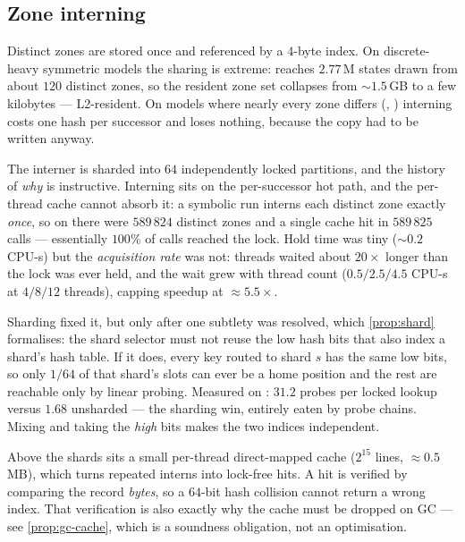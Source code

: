 \subsection{Zone interning}

\FigIntern

Distinct zones are stored once and referenced by a $4$-byte index.  On
discrete-heavy symmetric models the sharing is extreme:  reaches
$2.77$\,M states drawn from about $120$ distinct zones, so the resident zone set
collapses from $\sim1.5$\,GB to a few kilobytes --- L2-resident.  On models
where nearly every zone differs (, ) interning costs
one hash per successor and loses nothing, because the copy had to be written
anyway.

The interner is sharded into $64$ independently locked partitions, and the
history of \emph{why} is instructive.  Interning sits on the per-successor hot
path, and the per-thread cache cannot absorb it: a symbolic run interns each
distinct zone exactly \emph{once}, so on  there were $589\,824$
distinct zones and a single cache hit in $589\,825$ calls --- essentially $100\%$
of calls reached the lock.  Hold time was tiny ($\sim0.2$ CPU-s) but the
\emph{acquisition rate} was not: threads waited about $20\times$ longer than the
lock was ever held, and the wait grew with thread count ($0.5 / 2.5 / 4.5$
CPU-s at $4/8/12$ threads), capping speedup at $\approx 5.5\times$.

Sharding fixed it, but only after one subtlety was resolved, which
\cref{prop:shard} formalises: the shard selector must not reuse the low hash
bits that also index a shard's hash table.  If it does, every key routed to
shard $s$ has the same low bits, so only $1/64$ of that shard's slots can ever
be a home position and the rest are reachable only by linear probing.  Measured
on : $31.2$ probes per locked lookup versus $1.68$ unsharded ---
the sharding win, entirely eaten by probe chains.  Mixing and taking the
\emph{high} bits makes the two indices independent.

Above the shards sits a small per-thread direct-mapped cache
($2^{15}$ lines, $\approx 0.5$\,MB), which turns repeated interns into
lock-free hits.  A hit is verified by comparing the record \emph{bytes}, so a
$64$-bit hash collision cannot return a wrong index.  That verification is also
exactly why the cache must be dropped on GC ---
see \cref{prop:gc-cache}, which is a soundness obligation, not an optimisation.

